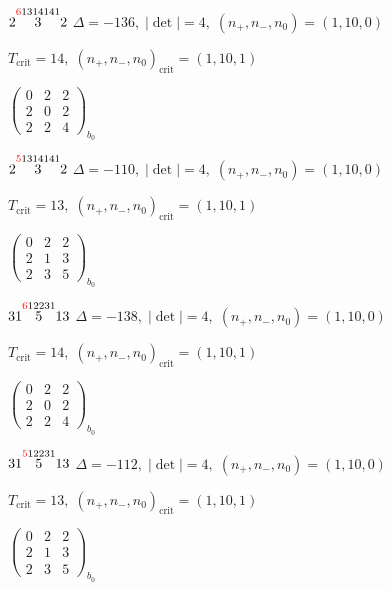 \documentclass[10pt]{article}
\begin{document}
$2\overset{\textcolor{red}{6}1314141}{3}2$ \quad $\Delta=-136,\; |\det|=4,\; (n_+,n_-,n_0)=(1,10,0)$

\hspace{1em}$T_{\text{crit}}=14,\; (n_+,n_-,n_0)_{\text{crit}}=(1,10,1)$

\hspace{2em}$\left(\begin{smallmatrix}0 & 2 & 2 \\ 2 & 0 & 2 \\ 2 & 2 & 4\end{smallmatrix}\right)_{\!b_0}$

$2\overset{\textcolor{red}{5}1314141}{3}2$ \quad $\Delta=-110,\; |\det|=4,\; (n_+,n_-,n_0)=(1,10,0)$

\hspace{1em}$T_{\text{crit}}=13,\; (n_+,n_-,n_0)_{\text{crit}}=(1,10,1)$

\hspace{2em}$\left(\begin{smallmatrix}0 & 2 & 2 \\ 2 & 1 & 3 \\ 2 & 3 & 5\end{smallmatrix}\right)_{\!b_0}$

\smallskip

$31\overset{\textcolor{red}{6}12231}{5}13$ \quad $\Delta=-138,\; |\det|=4,\; (n_+,n_-,n_0)=(1,10,0)$

\hspace{1em}$T_{\text{crit}}=14,\; (n_+,n_-,n_0)_{\text{crit}}=(1,10,1)$

\hspace{2em}$\left(\begin{smallmatrix}0 & 2 & 2 \\ 2 & 0 & 2 \\ 2 & 2 & 4\end{smallmatrix}\right)_{\!b_0}$

$31\overset{\textcolor{red}{5}12231}{5}13$ \quad $\Delta=-112,\; |\det|=4,\; (n_+,n_-,n_0)=(1,10,0)$

\hspace{1em}$T_{\text{crit}}=13,\; (n_+,n_-,n_0)_{\text{crit}}=(1,10,1)$

\hspace{2em}$\left(\begin{smallmatrix}0 & 2 & 2 \\ 2 & 1 & 3 \\ 2 & 3 & 5\end{smallmatrix}\right)_{\!b_0}$
\end{document}
